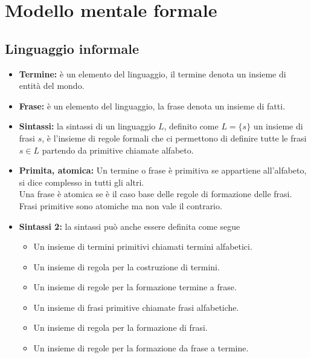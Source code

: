\documentclass[../main.tex]{subfiles}
\begin{document}
    \chapter{Modello mentale formale}
    \section{Linguaggio informale}
    \begin{itemize}
        \item \textbf{Termine:} è un elemento del linguaggio, il termine denota un insieme di entità del mondo.
        \item \textbf{Frase:} è un elemento del linguaggio, la frase denota un insieme di fatti.
        \item \textbf{Sintassi:} la sintassi di un linguaggio $L$, definito come $L=\{s\}$ un insieme di frasi $s$, è l'insieme di regole formali che ci permettono di definire tutte le frasi $s \in L$ partendo da primitive chiamate alfabeto.
        \item \textbf{Primita, atomica:} Un termine o frase è primitiva se appartiene all'alfabeto, si dice complesso in tutti gli altri.\\
            Una frase è atomica se è il caso base delle regole di formazione delle frasi.\\
            Frasi primitive sono atomiche ma non vale il contrario.
        \item \textbf{Sintassi 2:} la sintassi può anche essere definita come segue
            \begin{itemize}
                \item Un insieme di termini primitivi chiamati termini alfabetici.
                \item Un insieme di regola per la costruzione di termini.
                \item Un insieme di regole per la formazione termine a frase.
                \item Un insieme di frasi primitive chiamate frasi alfabetiche.
                \item Un insieme di regola per la formazione di frasi.
                \item Un insieme di regole per la formazione da frase a termine.
            \end{itemize}
    \end{itemize}
\end{document}
